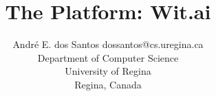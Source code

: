 \documentclass[twoside,11pt]{article}
\begin{document}
\title{The Platform: Wit.ai}

\author{\name André E. dos Santos \email dossantos@cs.uregina.ca \\
\addr Department of Computer Science \\
University of Regina \\ 
Regina, Canada
}



\maketitle

\begin{abstract}%
\end{abstract}




%
%
%
%
%

\vskip 0.2in

\end{document}
